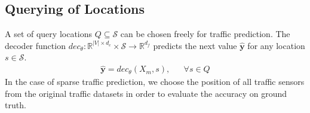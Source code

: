 \subsection{Querying of Locations}
\label{subsec:query}

A set of query locations $Q \subseteq \mathcal{S}$ can be chosen freely for traffic prediction.
The decoder function $dec_{\theta}: \mathbb{R}^{|V| \times d_e} \times \mathcal{S} \to \mathbb{R}^{d_f}$ predicts the next value $\hat{\bm{y}}$ for any location $s \in \mathcal{S}$.
\begin{align}
    \hat{\bm{y}} = dec_{\theta}(X_m, s),& &  \forall s \in Q
\end{align}
In the case of sparse traffic prediction, we choose the position of all traffic sensors from the original traffic datasets in order to evaluate the accuracy on ground truth.
